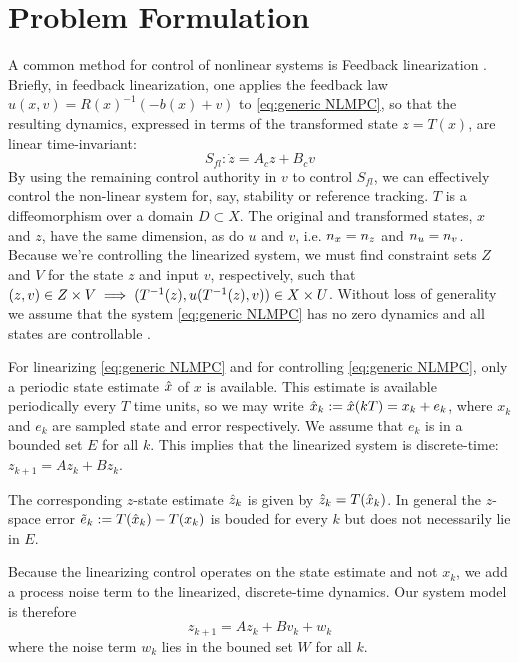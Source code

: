 \section{Problem Formulation} 
\label{sec:formulation}
A common method for control of nonlinear systems is Feedback linearization \cite{khalil}. 
Briefly, in feedback linearization, one applies the feedback law $u(x,v) = R(x)^{-1}(-b(x)+v)$ to \eqref{eq:generic NLMPC}, so that the resulting dynamics, expressed in terms of the transformed state $z = T(x)$, are linear time-invariant:
\begin{equation}
\label{eq:LTI_fb_lin}
S_{fl}: \dot{z} = A_cz + B_cv
\end{equation}
By using the remaining control authority in $v$ to control $S_{fl}$, we can effectively control the non-linear system for, say, stability or reference tracking.
$T$ is a diffeomorphism over a domain $D \subset X$.
The original and transformed states, $x$ and $z$, have the same dimension, as do $u$ and $v$, i.e. $n_x = n_z$ and $n_u = n_v$.
Because we're controlling the linearized system, we must find constraint sets $Z$ and $V$ for the state $z$ and input $v$, respectively, such that $(z,v) \in Z\times V \implies (T^{-1}(z), u(T^{-1}(z), v)) \in X \times U$.
Without loss of generality we assume that the system \eqref{eq:generic NLMPC} has no zero dynamics and all states are controllable \cite{khalil}. 

For linearizing \eqref{eq:generic NLMPC} and for controlling \eqref{eq:generic NLMPC}, only a periodic state estimate $\hat{x}$ of $x$ is available.
This estimate is available periodically every $T$ time units, so we may write $\hat{x}_{k} := \hat{x}(kT) = x_k + e_k$, where $x_k$ and $e_k$ are sampled state and error respectively.
We assume that $e_k$ is in a bounded set $E$ for all $k$.
This implies that the linearized system is discrete-time: $z_{k+1} = Az_k + B z_k$.

The corresponding $z$-state estimate $\hat{z}_{k}$ is given by $\hat{z}_{k} = T(\hat{x}_{k})$.
In general the $z$-space error $\tilde{e}_k := T(\hat{x}_k) - T(x_k)$ is bouded for every $k$ but does not necessarily lie in $E$.

Because the linearizing control operates on the state estimate and not $x_k$, we add a process noise term to the linearized, discrete-time dynamics. 
Our system model is therefore
\begin{equation}
z_{k+1} = Az_k + Bv_k + w_k
\end{equation}
where the noise term $w_k$ lies in the bouned set $W$ for all $k$.


